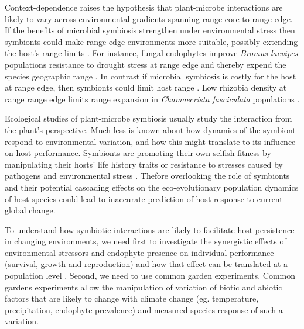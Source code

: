 \documentclass[11pt]{article}
\begin{document}
Context-dependence raises the hypothesis that plant-microbe interactions are likely to vary across environmental gradients spanning range-core to range-edge. 
If the benefits of microbial symbiosis strengthen under environmental stress then symbionts could make range-edge environments more suitable, possibly extending the host’s range limits \citep{allsup2023shifting,rudgers2020climate}.
For instance, fungal endophytes improve \emph{Bromus laevipes} populations resistance to drought stress at range edge and thereby expend the species geographic range \citep{david2019soil,afkhami2014mutualist}.
In contrast if microbial symbiosis is costly for the host at range edge, then symbionts could limit host range \citep{benning2021microbes,benning2021plant}.
Low rhizobia density at range range edge limits range expansion in \emph{Chamaecrista fasciculata} populations \citep{stanton2011does}. 

Ecological studies of plant-microbe symbiosis usually study the interaction from the plant’s perspective. 
Much less is known about how dynamics of the symbiont respond to environmental variation, and how this might translate to its influence on host performance. 
Symbionts are promoting their own selfish fitness by manipulating their hosts' life history traits or resistance to stresses caused by pathogens and environmental stress \citep{kazenel2015mutualistic,giauque2019endophyte,saikkonen1998fungal}. 
Thefore overlooking the role of symbionts and their potential cascading effects on the eco-evolutionary population dynamics of host species  could lead to inaccurate prediction of host response to current global change. 

To understand how symbiotic interactions are likely to facilitate host persistence in changing environments, we need first to investigate the synergistic effects of environmental stressors and endophyte presence on individual performance (survival, growth and reproduction) and how that effect can be translated at a population level \citep{bruno2003inclusion,de2006fungal}. 
Second, we need to use common garden experiments.
Common gardens experiments allow the manipulation of variation of biotic and abiotic factors that are likely to change with climate change (eg. temperature, precipitation, endophyte prevalence) and measured species response of such a variation.  
\end{document}
